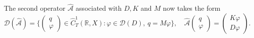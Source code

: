 \documentclass[english]{myarticle}
\begin{document}
\begin{sloppypar}
The second operator $\hat{\mathcal{A}}$ associated with $D, K$ and $M$ now takes the form 
\begin{equation*}
    \mathcal{D}(\hat{\mathcal{A}}) = \bigg \{ \begin{pmatrix}
    q\\
    \varphi
    \end{pmatrix}
    \in \hat{C}_T^1(\mathbb{R},X) : \varphi \in \mathcal{D}(D), \ q = M\varphi \bigg \}, \quad 
    \hat{\mathcal{A}}
    \begin{pmatrix}
    q\\
    \varphi
    \end{pmatrix}
    =
    \begin{pmatrix}
    K\varphi \\
    D\varphi
    \end{pmatrix}.
\end{equation*}


\end{sloppypar}
\end{document}
